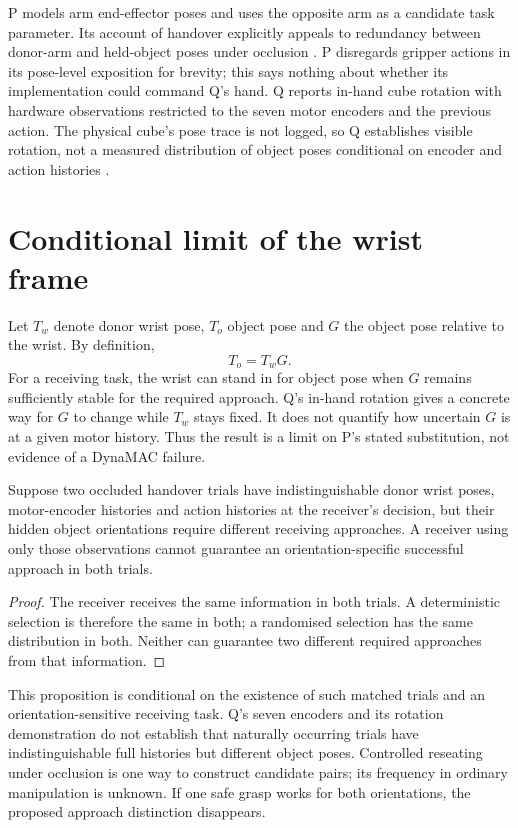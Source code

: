 \documentclass{article}
\begin{document}
P models arm end-effector poses and uses the opposite arm as a candidate task parameter. Its account of handover
explicitly appeals to redundancy between donor-arm and held-object poses under occlusion \cite{p}. P disregards gripper
actions in its pose-level exposition for brevity; this says nothing about whether its implementation could command Q's
hand. %
Q reports in-hand cube rotation with hardware observations restricted to the seven motor encoders and the previous
action. The physical cube's pose trace is not logged, so Q establishes visible rotation, not a measured distribution of
object poses conditional on encoder and action histories \cite{q}. %

\section{Conditional limit of the wrist frame}

Let \(T_w\) denote donor wrist pose, \(T_o\) object pose and \(G\) the object pose relative to the wrist. By definition, %
\[
T_o=T_wG.
\]
For a receiving task, the wrist can stand in for object pose when \(G\) remains sufficiently stable for the required
approach. Q's in-hand rotation gives a concrete way for \(G\) to change while \(T_w\) stays fixed. It does not quantify
how uncertain \(G\) is at a given motor history. Thus the result is a limit on P's stated substitution, not evidence of
a DynaMAC failure. %

\begin{proposition}
Suppose two occluded handover trials have indistinguishable donor wrist poses, motor-encoder histories and action
histories at the receiver's decision, but their hidden object orientations require different receiving approaches. A
receiver using only those observations cannot guarantee an orientation-specific successful approach in both trials.
\end{proposition}

\begin{proof}
The receiver receives the same information in both trials. A deterministic selection is therefore the same in both; a
randomised selection has the same distribution in both. Neither can guarantee two different required approaches from
that information. %
\end{proof}

This proposition is conditional on the existence of such matched trials and an orientation-sensitive receiving task. Q's
seven encoders and its rotation demonstration do not establish that naturally occurring trials have indistinguishable
full histories but different object poses. Controlled reseating under occlusion is one way to construct candidate pairs;
its frequency in ordinary manipulation is unknown. If one safe grasp works for both orientations, the proposed approach
distinction disappears. %
\end{document}
